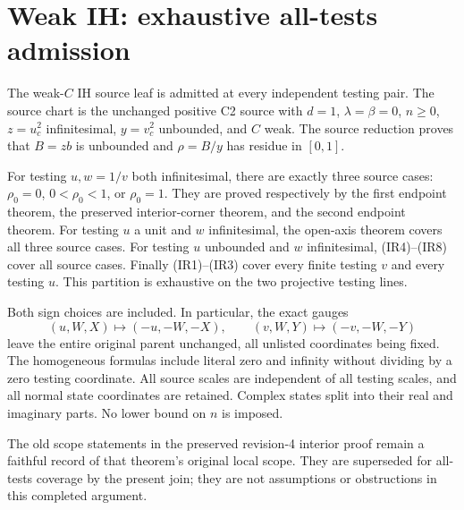 \section{Weak IH: exhaustive all-tests admission}
\label{sec:weak-ih-join}
The weak-$C$ IH source leaf is admitted at every independent testing
pair. The source chart is the unchanged positive C2 source with
$d=1$, $\lambda=\beta=0$, $n\ge0$, $z=u_c^2$ infinitesimal,
$y=v_c^2$ unbounded, and $C$ weak. The source reduction proves that
$B=zb$ is unbounded and $\rho=B/y$ has residue in $[0,1]$.

For testing $u,w=1/v$ both infinitesimal, there are exactly three
source cases: $\rho_0=0$, $0<\rho_0<1$, or $\rho_0=1$.
They are proved respectively by the first endpoint theorem, the
preserved interior-corner theorem, and the second endpoint theorem.
For testing $u$ a unit and $w$ infinitesimal, the open-axis theorem
covers all three source cases. For testing $u$ unbounded and $w$
infinitesimal, (IR4)--(IR8) cover all source cases. Finally (IR1)--(IR3)
cover every finite testing $v$ and every testing $u$.
This partition is exhaustive on the two projective testing lines.

Both sign choices are included. In particular, the exact gauges
\[
 (u,W,X)\mapsto(-u,-W,-X),\qquad
 (v,W,Y)\mapsto(-v,-W,-Y)
\]
leave the entire original parent unchanged, all unlisted coordinates
being fixed. The homogeneous formulas include literal zero and
infinity without dividing by a zero testing coordinate. All source
scales are independent of all testing scales, and all normal state
coordinates are retained. Complex states split into their real and
imaginary parts. No lower bound on $n$ is imposed.

The old scope statements in the preserved revision-4 interior proof
remain a faithful record of that theorem's original local scope.
They are superseded for all-tests coverage by the present join;
they are not assumptions or obstructions in this completed argument.
